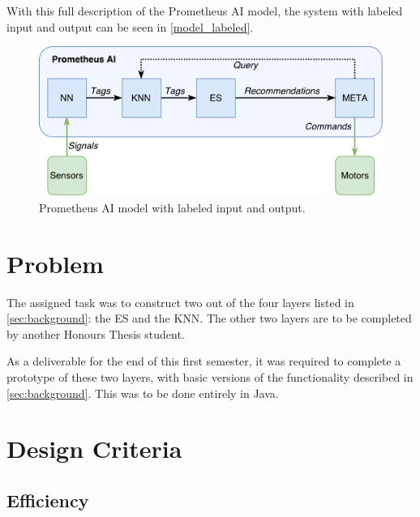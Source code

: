 \documentclass[titlepage,11pt]{article}
\begin{document}
With this full description of the Prometheus AI model, the system with labeled input and output can be seen in \autoref{model_labeled}.

\begin{figure}[!htb]
	\includegraphics[width=\textwidth]{figures/ai_model_labeled.pdf}
	\caption{Prometheus AI model with labeled input and output.}
	\label{model_labeled}
\end{figure}

\section{Problem}

The assigned task was to construct two out of the four layers listed in \autoref{sec:background}: the ES and the KNN. The other two layers are to be completed by another Honours Thesis student.

As a deliverable for the end of this first semester, it was required to complete a prototype of these two layers, with basic versions of the functionality described in \autoref{sec:background}. This was to be done entirely in Java.

\section{Design Criteria}

\subsection{Efficiency}
\end{document}
